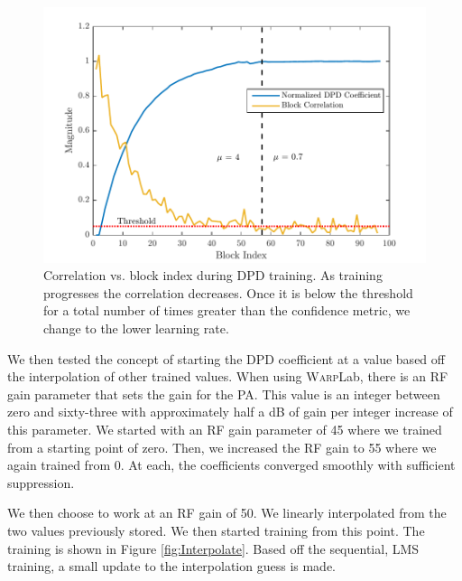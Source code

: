 \begin{figure}[t!] 
\centering
\includegraphics[width=0.9\columnwidth]{Figures/Convergence_Mu}
\caption{Correlation vs. block index during DPD training. 
	As training progresses the correlation decreases. 
	Once it is below the threshold for a total number of times greater than the confidence metric, we change to the lower learning rate.}
\label{fig:Convergence_Mu}
\end{figure}

We then tested the concept of starting the DPD coefficient at a value based off the interpolation of other trained values. 
When using \textsc{Warp}Lab, there is an RF gain parameter that sets the gain for the PA. This value is an integer between zero and sixty-three with approximately half a dB of gain per integer increase of this parameter. We started with an RF gain parameter of 45 where we trained from a starting point of zero. Then, we increased the RF gain to 55 where we again trained from 0. At each, the coefficients converged smoothly with sufficient suppression. 

We then choose to work at an RF gain of 50. We linearly interpolated from the two values previously stored. We then started training from this point. The training is shown in Figure \ref{fig:Interpolate}. Based off the sequential, LMS training, a small update to the interpolation guess is made. 

